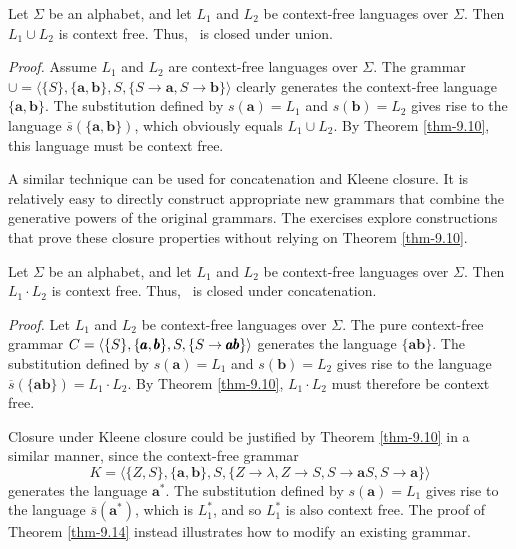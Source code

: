 \begin{thm}\label{thm-9.12}
Let $\Sigma$ be an alphabet, and let $L_1$ and $L_2$ be context-free languages
over $\Sigma$. Then $L_1\cup L_2$ is context free. Thus, \CSIG\ is closed under
union.

\emph{Proof.} Assume $L_1$ and $L_2$ are context-free languages over $\Sigma$. 
The grammar $\pmb{\cup} = \langle\{S\},\{\pmb{a},\pmb{b}\},S,
\{S  \rightarrow  \pmb{a},S  \rightarrow  \pmb{b}\}\rangle$
clearly generates the context-free language
$\{\pmb{a},\pmb{b}\}$. The substitution defined by $s(\pmb{a})=L_1$ and $s(
\pmb{b})=L_2$ gives rise to the language $\overline{s}(\{\pmb{a},\pmb{b}\})$,
which obviously equals $L_1\cup L_2$. By Theorem \ref{thm-9.10}, this language must be
context free.
\end{thm}

A similar technique can be used for concatenation and Kleene closure. It is
relatively easy to directly construct appropriate new grammars that combine the
generative powers of the original grammars. The exercises explore constructions
that prove these closure properties without relying on Theorem \ref{thm-9.10}.

\begin{thm}\label{thm-9.13}
Let $\Sigma$ be an alphabet, and let $L_1$ and $L_2$ be context-free languages
over $\Sigma$. Then $L_1\cdot L_2$ is context free. Thus, \CSIG\ is closed under
concatenation.

\emph{Proof.} Let $L_1$ and $L_2$ be context-free languages over $\Sigma$. The
pure context-free grammar $C=\langle\{S\},\{\pmb{a},\pmb{b}\},\\S,\{S\rightarrow
\pmb{ab}\}\rangle$ generates the language $\{\pmb{ab}\}$. The substitution
defined by $s(\pmb{a})=L_1$ and $s(\pmb{b})=L_2$ gives rise to the language
$\overline{s}(\{\pmb{ab}\})=L_1\cdot L_2$. By Theorem \ref{thm-9.10}, $L_1\cdot L_2$ must
therefore be context free.
\end{thm}

Closure under Kleene closure could be justified by Theorem \ref{thm-9.10} in a similar
manner, since the context-free grammar
\[ K= \langle\{Z,S\},\{\pmb{a},\pmb{b}\},S,\{Z\rightarrow\lambda,Z\rightarrow S,
S\rightarrow\pmb{a}S,S\rightarrow\pmb{a}\}\rangle \]
generates the language $\pmb{a}^*$. The substitution defined by $s(\pmb{a})=L_1$
gives rise to the language $\overline{s}(\pmb{a}^*)$, which is $L^*_1$, and so
$L^*_1$ is also context free. The proof of Theorem \ref{thm-9.14} instead illustrates how
to modify an existing grammar.

